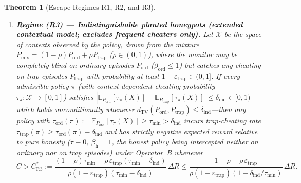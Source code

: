 \documentclass[11pt,a4paper]{article}
\newtheorem{theorem}{Theorem}
\newcommand{\E}{\mathbb{E}}
\newcommand{\dTV}{d_{\mathrm{TV}}}
\begin{document}
\begin{theorem}[Escape Regimes R1, R2, and R3]
\begin{enumerate}
  \item \textbf{Regime (R3) --- Indistinguishable planted honeypots (extended contextual model; excludes frequent cheaters only).} Let $\mathcal{X}$ be the space of contexts observed by the policy, drawn from the mixture $P_{\mathrm{mix}} = (1-\rho)P_{\mathrm{ord}} + \rho P_{\mathrm{trap}}$ ($\rho \in (0, 1)$), where the monitor may be completely blind on ordinary episodes $P_{\mathrm{ord}}$ ($\beta_{\mathrm{ord}} \le 1$) but catches any cheating on trap episodes $P_{\mathrm{trap}}$ with probability at least $1 - \varepsilon_{\mathrm{trap}} \in (0, 1]$. If every admissible policy $\pi$ (with context-dependent cheating probability $\tau_{\pi} : \mathcal{X} \to [0, 1]$) satisfies $|\E_{P_{\mathrm{ord}}}[\tau_\pi(X)] - \E_{P_{\mathrm{trap}}}[\tau_\pi(X)]| \le \delta_{\mathrm{ind}} \in [0, 1)$---which holds unconditionally whenever $\dTV(P_{\mathrm{ord}}, P_{\mathrm{trap}}) \le \delta_{\mathrm{ind}}$---then any policy with $\tau_{\mathrm{ord}}(\pi) := \E_{P_{\mathrm{ord}}}[\tau_\pi(X)] \ge \tau_{\min} > \delta_{\mathrm{ind}}$ incurs trap-cheating rate $\tau_{\mathrm{trap}}(\pi) \ge \tau_{\mathrm{ord}}(\pi) - \delta_{\mathrm{ind}}$ and has strictly negative expected reward relative to pure honesty ($\tau \equiv 0$, $\beta_{\mathrm{h}} = 1$, the honest policy being intercepted neither on ordinary nor on trap episodes) under Operator~B whenever
  \begin{equation}\label{eq:R3}
    C > C_{\mathrm{R3}}^*
    := \frac{(1-\rho)\tau_{\min} + \rho\,\varepsilon_{\mathrm{trap}}(\tau_{\min} - \delta_{\mathrm{ind}})}{\rho(1 - \varepsilon_{\mathrm{trap}})(\tau_{\min} - \delta_{\mathrm{ind}})}\,\Delta R
    \le \frac{1 - \rho + \rho\,\varepsilon_{\mathrm{trap}}}{\rho(1 - \varepsilon_{\mathrm{trap}})(1 - \delta_{\mathrm{ind}}/\tau_{\min})}\,\Delta R.
  \end{equation}
\end{enumerate}
\end{theorem}
\end{document}
